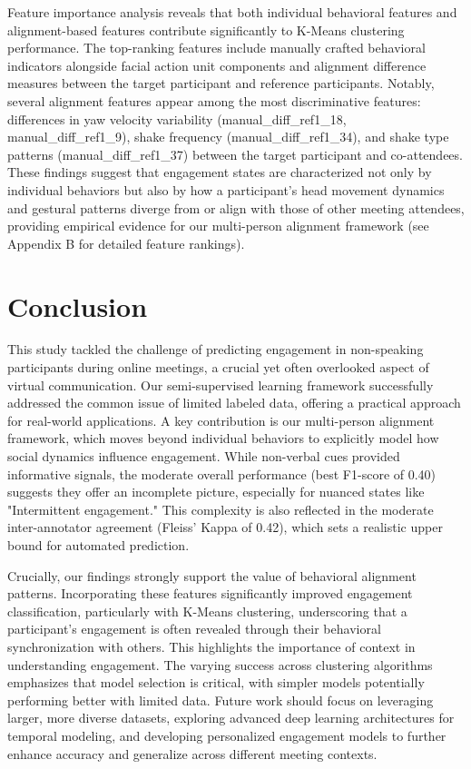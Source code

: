 \documentclass[
]{ceurart}
\begin{document}
Feature importance analysis reveals that both individual behavioral features and alignment-based features contribute significantly to K-Means clustering performance. The top-ranking features include manually crafted behavioral indicators alongside facial action unit components and alignment difference measures between the target participant and reference participants. Notably, several alignment features appear among the most discriminative features: differences in yaw velocity variability (manual\_diff\_ref1\_18, manual\_diff\_ref1\_9), shake frequency (manual\_diff\_ref1\_34), and shake type patterns (manual\_diff\_ref1\_37) between the target participant and co-attendees. These findings suggest that engagement states are characterized not only by individual behaviors but also by how a participant's head movement dynamics and gestural patterns diverge from or align with those of other meeting attendees, providing empirical evidence for our multi-person alignment framework (see Appendix B for detailed feature rankings).

\section{Conclusion}
This study tackled the challenge of predicting engagement in non-speaking participants during online meetings, a crucial yet often overlooked aspect of virtual communication. Our semi-supervised learning framework successfully addressed the common issue of limited labeled data, offering a practical approach for real-world applications. A key contribution is our multi-person alignment framework, which moves beyond individual behaviors to explicitly model how social dynamics influence engagement. While non-verbal cues provided informative signals, the moderate overall performance (best F1-score of 0.40) suggests they offer an incomplete picture, especially for nuanced states like "Intermittent engagement." This complexity is also reflected in the moderate inter-annotator agreement (Fleiss' Kappa of 0.42), which sets a realistic upper bound for automated prediction.

Crucially, our findings strongly support the value of behavioral alignment patterns. Incorporating these features significantly improved engagement classification, particularly with K-Means clustering, underscoring that a participant's engagement is often revealed through their behavioral synchronization with others. This highlights the importance of context in understanding engagement. The varying success across clustering algorithms emphasizes that model selection is critical, with simpler models potentially performing better with limited data. Future work should focus on leveraging larger, more diverse datasets, exploring advanced deep learning architectures for temporal modeling, and developing personalized engagement models to further enhance accuracy and generalize across different meeting contexts.
\end{document}
